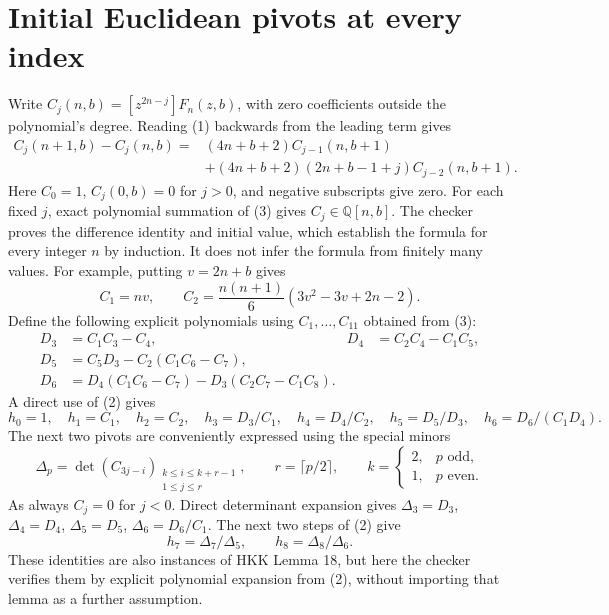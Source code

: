 \documentclass[11pt]{article}
\begin{document}
\section{Initial Euclidean pivots at every index}
Write $C_j(n,b)=[z^{2n-j}]F_n(z,b)$, with zero coefficients outside
the polynomial's degree. Reading (1) backwards from the leading term
gives
\begin{align*}
 C_j(n+1,b)-C_j(n,b)
  ={}&(4n+b+2)C_{j-1}(n,b+1)\\
     &+(4n+b+2)(2n+b-1+j)C_{j-2}(n,b+1).                  \tag{3}
\end{align*}
Here $C_0=1$, $C_j(0,b)=0$ for $j>0$, and negative subscripts give zero.
For each fixed $j$, exact polynomial summation of (3) gives
$C_j\in\mathbb Q[n,b]$. The checker proves the difference identity
and initial value, which establish the formula for every integer $n$
by induction. It does not infer the formula from finitely many values.
For example, putting $v=2n+b$ gives
\[
 C_1=nv,\qquad C_2=\frac{n(n+1)}6(3v^2-3v+2n-2).
\]
Define the following explicit polynomials using $C_1,\ldots,C_{11}$
obtained from (3):
\begin{align*}
 D_3&=C_1C_3-C_4,&D_4&=C_2C_4-C_1C_5,\\
 D_5&=C_5D_3-C_2(C_1C_6-C_7),\\
 D_6&=D_4(C_1C_6-C_7)-D_3(C_2C_7-C_1C_8).
\end{align*}
A direct use of (2) gives
\[
 h_0=1,\quad h_1=C_1,\quad h_2=C_2,\quad h_3=D_3/C_1,
 \quad h_4=D_4/C_2,\quad h_5=D_5/D_3,
 \quad h_6=D_6/(C_1D_4).                                  \tag{4}
\]
The next two pivots are conveniently expressed using the special minors
\[
 \Delta_p=\det(C_{3j-i})_{\substack{k\le i\le k+r-1\\1\le j\le r}},
 \qquad r=\lceil p/2\rceil,\qquad
 k=\begin{cases}2,&p\text{ odd},\\1,&p\text{ even}.\end{cases}
\]
As always $C_j=0$ for $j<0$.
Direct determinant expansion gives
$\Delta_3=D_3$, $\Delta_4=D_4$, $\Delta_5=D_5$,
$\Delta_6=D_6/C_1$.
The next two steps of (2) give
\[
 h_7=\Delta_7/\Delta_5,\qquad h_8=\Delta_8/\Delta_6.           \tag{5}
\]
These identities are also instances of HKK Lemma 18, but here the
checker verifies them by explicit polynomial expansion from (2),
without importing that lemma as a further assumption.
\end{document}
